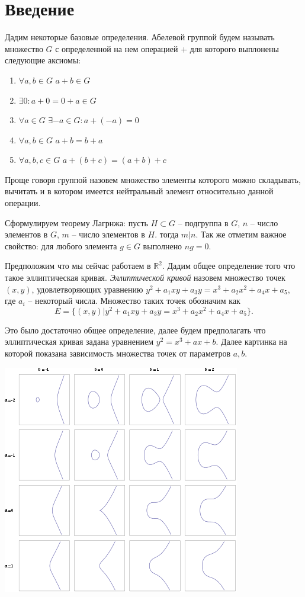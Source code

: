 \documentclass[a4paper,12pt]{article}
\begin{document}
    \section{Введение}
        Дадим некоторые базовые определения.
        Абелевой группой будем называть множество $G$ с определенной на нем операцией $+$ для которого выплонены следующие аксиомы:
        \begin{enumerate}
            \item $\forall a, b \in G$ $a + b \in G$
            \item $\exists 0 : a + 0 = 0 + a \in G$
            \item $\forall a \in G$ $\exists -a \in G : a + (-a) = 0$
            \item $\forall a, b \in G$ $a + b = b + a$
            \item $\forall a, b, c \in G$ $a + (b + c) = (a + b) + c$
        \end{enumerate}
        Проще говоря группой назовем множество элементы которого можно складывать, 
        вычитать и в котором имеется нейтральный элемент относительно данной операции.

        Сформулируем теорему Лагрнжа: пусть $H \subset G$ -- подгруппа в $G$, $n$ -- число элементов в $G$, $m$ -- число элементов в $H$. тогда
        $m | n$. Так же отметим важное свойство: для любого элемента $g \in G$ выполнено $ng = 0$.

        Предположим что мы сейчас работаем в $\mathbb{R}^2$.
        Дадим общее определение того что такое эллиптическая кривая. \textit{Эллиптической кривой} назовем множество точек $(x, y)$,
        удовлетворяющих уравнению $y^2 + a_1xy+a_3y = x^3+a_2x^2+a_4x + a_5$, где $a_i$ -- некоторый числа.
        Множество таких точек обозначим как 
        $$
            E = \{(x, y) | y^2 + a_1xy+a_3y = x^3+a_2x^2+a_4x + a_5\}.
        $$

        Это было достаточно общее определение, далее будем предполагать что эллиптическая кривая задана уравнением
        $y^2 = x^3 + ax + b$. Далее картинка на которой показана зависимость множества точек от параметров $a, b$.

        \includegraphics{EC}
\end{document}
